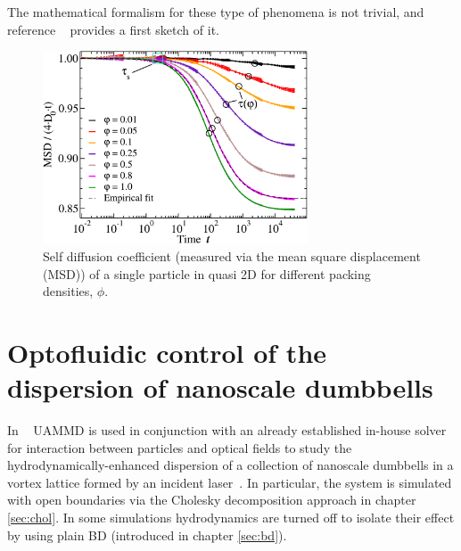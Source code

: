 \documentclass[twoside,openright,titlepage,numbers=noenddot,%
headinclude,footinclude,cleardoublepage=empty,abstract=on,
BCOR=5mm,fontsize=11pt, dvipsnames, paper=b5
]{scrreprt}
\newcommand{\uammd}{\gls{UAMMD}\xspace}
\begin{document}
The mathematical formalism for these type of phenomena is not trivial, and reference ~\cite{Pelaez2018} provides a first sketch of it.
\begin{figure}[H]
  \centering
  \includegraphics[width=0.7\textwidth]{gfx/q2Dselfreduction}
  \caption[ ]{Self diffusion coefficient (measured via the mean square displacement (MSD)) of a single particle in quasi 2D for different packing densities, $\phi$.}
  \label{fig:q2Dselfreduction}
\end{figure}






\chapter{Optofluidic control of the dispersion of nanoscale dumbbells}

In ~\cite{Melendez2019} \uammd is used in conjunction with an already established in-house solver for interaction between particles and optical fields to study the hydrodynamically-enhanced dispersion of a collection of nanoscale dumbbells in a vortex lattice formed by an incident laser~\cite{Buscalioni2018}. In particular, the system is simulated with open boundaries via the Cholesky decomposition approach in chapter \ref{sec:chol}. In some simulations hydrodynamics are turned off to isolate their effect by using plain \gls{BD} (introduced in chapter \ref{sec:bd}).
\end{document}

